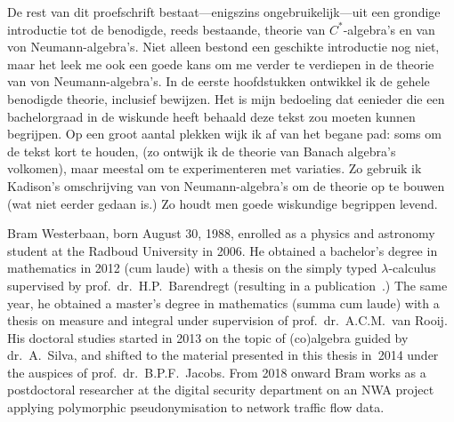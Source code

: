 \documentclass[b5paper]{book}
\begin{document}
De rest van dit proefschrift bestaat---enigszins ongebruikelijk---uit 
een grondige introductie
tot de benodigde, reeds bestaande, theorie
van $C^*$-algebra's en van von Neumann-algebra's.
Niet alleen bestond
een geschikte introductie nog niet, maar het leek me ook een goede kans 
om me verder te verdiepen in de theorie van von Neumann-algebra's.
In de eerste hoofdstukken ontwikkel ik de gehele benodigde theorie, inclusief 
bewijzen.
Het is mijn bedoeling dat eenieder die een bachelorgraad in de wiskunde heeft 
behaald deze tekst zou moeten kunnen begrijpen.
Op een groot aantal plekken wijk ik af van 
het begane pad:
soms om de tekst kort te houden, (zo ontwijk ik de
theorie van Banach algebra's volkomen),
maar meestal om te experimenteren met variaties.
Zo gebruik ik Kadison's omschrijving
van von Neumann-algebra's om
de theorie op te bouwen (wat niet eerder gedaan is.)
Zo houdt men goede wiskundige begrippen levend.

Bram Westerbaan, born August 30, 1988,
enrolled as a physics and astronomy student at 
the Radboud University in 2006.
He obtained a bachelor's degree in mathematics in 2012 (cum laude)
with a thesis
on the simply typed $\lambda$-calculus
supervised by prof.~dr.~H.P.~Barendregt
(resulting in a publication~\cite{brambachelor}.)
The same year,
he obtained a master's degree in mathematics (summa cum laude)
with a thesis\cite{brammaster} on measure and integral
under supervision of prof.~dr.~A.C.M.~van Rooij.
His doctoral studies started in 2013
on the topic of (co)algebra guided by dr.~A.~Silva,
and shifted 
to the material presented in this thesis
in~2014
under the auspices of prof.~dr.~B.P.F.~Jacobs.
From 2018 onward Bram works as a postdoctoral researcher
at the digital security department on
an NWA project applying polymorphic pseudonymisation
to network traffic flow data.

\end{document}
